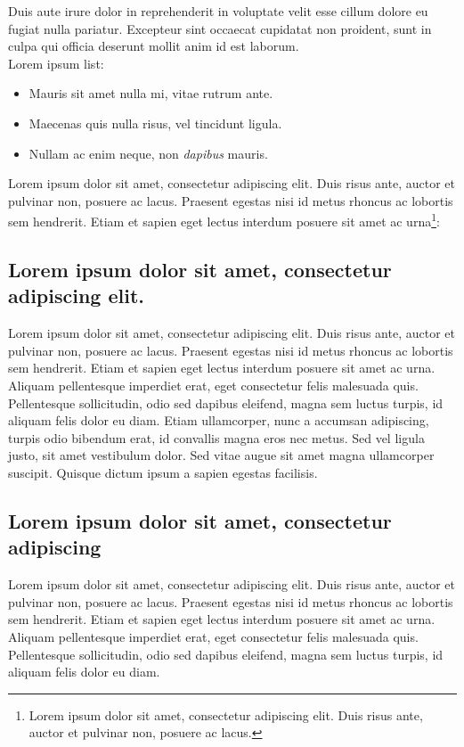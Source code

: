Duis aute irure dolor in reprehenderit in voluptate velit esse cillum dolore eu fugiat nulla pariatur. Excepteur sint occaecat cupidatat non proident, sunt in culpa qui officia deserunt mollit anim id est laborum. \\ Lorem ipsum list:
\begin{itemize}
\item Mauris sit amet nulla mi, vitae rutrum ante.
\item Maecenas quis nulla risus, vel tincidunt ligula.
\item Nullam ac enim neque, non \emph{dapibus} mauris.
\end{itemize}

\noindent Lorem ipsum dolor sit amet, consectetur adipiscing elit. Duis risus ante, auctor et pulvinar non, posuere ac lacus. Praesent egestas nisi id metus rhoncus ac lobortis sem hendrerit. Etiam et sapien eget lectus interdum posuere sit amet ac urna\footnote{Lorem ipsum dolor sit amet, consectetur adipiscing elit. Duis risus ante, auctor et pulvinar non, posuere ac lacus.}:

\subsection{Lorem ipsum dolor sit amet, consectetur adipiscing elit.}
Lorem ipsum dolor sit amet, consectetur adipiscing elit. Duis risus ante, auctor et pulvinar non, posuere ac lacus. Praesent egestas nisi id metus rhoncus ac lobortis sem hendrerit. Etiam et sapien eget lectus interdum posuere sit amet ac urna. Aliquam pellentesque imperdiet erat, eget consectetur felis malesuada quis. Pellentesque sollicitudin, odio sed dapibus eleifend, magna sem luctus turpis, id aliquam felis dolor eu diam. Etiam ullamcorper, nunc a accumsan adipiscing, turpis odio bibendum erat, id convallis magna eros nec metus. Sed vel ligula justo, sit amet vestibulum dolor. Sed vitae augue sit amet magna ullamcorper suscipit. Quisque dictum ipsum a sapien egestas facilisis. 

\subsection{Lorem ipsum dolor sit amet, consectetur adipiscing}
Lorem ipsum dolor sit amet, consectetur adipiscing elit. Duis risus ante, auctor et pulvinar non, posuere ac lacus. Praesent egestas nisi id metus rhoncus ac lobortis sem hendrerit. Etiam et sapien eget lectus interdum posuere sit amet ac urna. Aliquam pellentesque imperdiet erat, eget consectetur felis malesuada quis. Pellentesque sollicitudin, odio sed dapibus eleifend, magna sem luctus turpis, id aliquam felis dolor eu diam.

